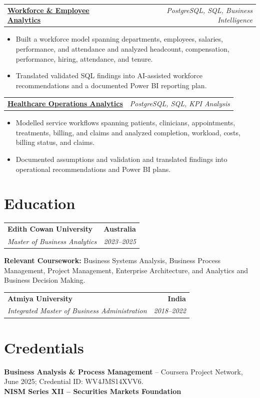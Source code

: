 \documentclass[letterpaper,10pt]{article}
\makeatletter
\newcommand{\role}[4]{%
  \begin{tabularx}{\textwidth}{@{}Xr@{}}
    \textbf{#1} & \textbf{#2} \\
    \textit{#3} & \textit{#4}
  \end{tabularx}\vspace{-1pt}
}
\newcommand{\project}[2]{%
  \begin{tabularx}{\textwidth}{@{}Xr@{}}
    \textbf{#1} & \textit{#2}
  \end{tabularx}\vspace{-1pt}
}
\makeatother
\begin{document}
\project{\href{https://github.com/jainalimehta/HR-Analytics}{Workforce \& Employee Analytics}}{PostgreSQL, SQL, Business Intelligence}
\begin{itemize}
  \item Built a workforce model spanning departments, employees, salaries, performance, and attendance and analyzed headcount, compensation, performance, hiring, attendance, and tenure.
  \item Translated validated SQL findings into AI-assisted workforce recommendations and a documented Power BI reporting plan.
\end{itemize}
\vspace{1pt}

\project{\href{https://github.com/jainalimehta/Healthcare-Analytics}{Healthcare Operations Analytics}}{PostgreSQL, SQL, KPI Analysis}
\begin{itemize}
  \item Modelled service workflows spanning patients, clinicians, appointments, treatments, billing, and claims and analyzed completion, workload, costs, billing status, and claims.
  \item Documented assumptions and validation and translated findings into operational recommendations and Power BI plans.
\end{itemize}

\section{Education}
\role{Edith Cowan University}{Australia}{Master of Business Analytics}{2023--2025}
\small\textbf{Relevant Coursework:} Business Systems Analysis, Business Process Management, Project Management, Enterprise Architecture, and Analytics and Business Decision Making.\\[2pt]
\role{Atmiya University}{India}{Integrated Master of Business Administration}{2018--2022}

\section{Credentials}
\small\textbf{Business Analysis \& Process Management} -- Coursera Project Network, June 2025; Credential ID: WV4JMS14XVV6.\\[-0.2pt]
\small\textbf{NISM Series XII -- Securities Markets Foundation}
\end{document}
